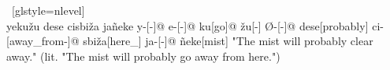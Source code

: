 \ex~[glstyle=nlevel]
\begingl
\glpreamble {} \\ yeku\v{z}u dese cisbi\v{z}a jañeke
\endpreamble
y-[{\Subj}-]@
e-[{\Pfv}-]@
ku[go]@
\v{z}u[-{\An}]
Ø-[{\Pfv}-]@
dese[probably]
ci-[away\_from-]@
sbi\v{z}a[here\_{\Prox}]
ja-[{\Nom}-]@
ñeke[mist]
\glft "The mist will probably clear away." (lit. "The mist will probably go away from here.")
\endgl
\xe


\endgroup
\iffalse


\ex~[glstyle=nlevel]
\begingl
\glpreamble \SG{} \\
\endpreamble

\glft ""
\endgl
\xe


\fi
